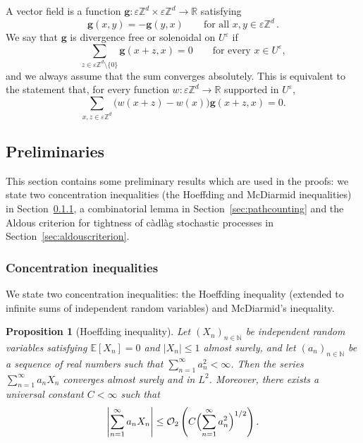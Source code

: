 \documentclass[11pt]{amsart}
\theoremstyle{plain}
\newtheorem{proposition}[theorem]{Proposition}
\theoremstyle{definition}
\theoremstyle{remark}
\newcommand{\E}{\mathbb{E}}
\newcommand{\Zd}{\mathbb{Z}^d}
\newcommand{\R}{\mathbb{R}}
\newcommand{\eps}{\varepsilon}
\begin{document}
	A vector field is a function $\mathbf{g} : \eps\Zd \times \eps\Zd \to \R$ satisfying
	\[
	\mathbf{g}(x,y) = -\mathbf{g}(y,x) \qquad \text{for all } x, y \in \eps\Zd\,.
	\]
	We say that $\mathbf{g}$ is divergence free or solenoidal on $U^\eps$ if
	\[
	\sum_{z \in \eps\Zd \setminus \{0\}} \mathbf{g}(x+z,x) = 0 \qquad \text{for every } x \in U^\eps,
	\]
	and we always assume that the sum converges absolutely.
	This is equivalent to the statement that, for every function $w : \eps\Zd \to \R$ supported in $U^\eps$,
	\begin{equation} \label{eq:gissolenoidal}
		\sum_{x, z \in \eps\Zd} \bigl(w(x+z) - w(x)\bigr) \mathbf{g}(x+z, x) = 0.
	\end{equation}
	
	\subsection{Preliminaries}
	
	This section contains some preliminary results which are used in the proofs: we state two concentration inequalities (the Hoeffding and McDiarmid inequalities) in Section~\ref{sec:concentration}, a combinatorial lemma in Section~\ref{sec:pathcounting} and the Aldous criterion for tightness of c\`adl\`ag stochastic processes in Section~\ref{sec:aldouscriterion}. 
	
	\subsubsection{Concentration inequalities} \label{sec:concentration}
	
	We state two concentration inequalities: the Hoeffding inequality (extended to infinite sums of independent random variables) and McDiarmid's inequality.
	
	\begin{proposition}[Hoeffding inequality] \label{prop:concentrationineq}
		Let $(X_n)_{n \in \mathbb{N}}$ be independent random variables satisfying $\E[X_n] = 0$ and $|X_n| \le 1$ almost surely, and let $(a_n)_{n \in \mathbb{N}}$ be a sequence of real numbers such that $\sum_{n=1}^\infty a_n^2 < \infty$.
		Then the series $\sum_{n=1}^\infty a_n X_n$ converges almost surely and in $L^2$.
		Moreover, there exists a universal constant $C < \infty$ such that
		\begin{equation} \label{ineq:Hoeffdinginfinitesum}
			\left| \sum_{n=1}^\infty a_n X_n \right| \leq \mathcal{O}_2\left( C\Bigl(\sum_{n=1}^\infty a_n^2\Bigr)^{1/2} \right).
		\end{equation}
	\end{proposition}
	
\end{document}
